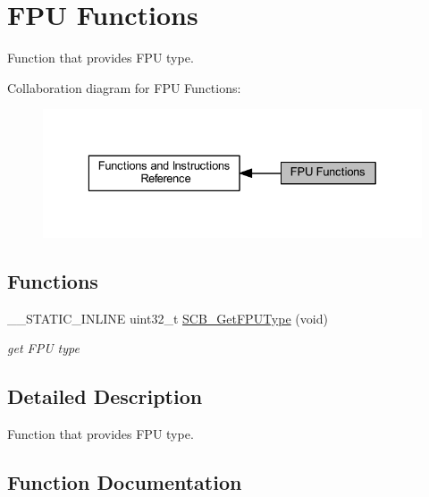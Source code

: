 \hypertarget{group___c_m_s_i_s___core___fpu_functions}{}\section{F\+PU Functions}
\label{group___c_m_s_i_s___core___fpu_functions}


Function that provides F\+PU type.  


Collaboration diagram for F\+PU Functions\+:
\nopagebreak
\begin{figure}[H]
\begin{center}
\leavevmode
\includegraphics[width=329pt]{group___c_m_s_i_s___core___fpu_functions}
\end{center}
\end{figure}
\subsection*{Functions}
\begin{DoxyCompactItemize}
\item 
\+\_\+\+\_\+\+S\+T\+A\+T\+I\+C\+\_\+\+I\+N\+L\+I\+NE uint32\+\_\+t \hyperlink{group___c_m_s_i_s___core___fpu_functions_ga6bcad99ce80a0e7e4ddc6f2379081756}{S\+C\+B\+\_\+\+Get\+F\+P\+U\+Type} (void)
\begin{DoxyCompactList}\small\item\em get F\+PU type \end{DoxyCompactList}\end{DoxyCompactItemize}


\subsection{Detailed Description}
Function that provides F\+PU type. 



\subsection{Function Documentation}
\mbox{\label{group___c_m_s_i_s___core___fpu_functions_ga6bcad99ce80a0e7e4ddc6f2379081756}} 

